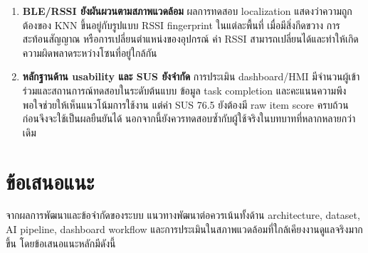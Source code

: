 \begin{enumerate}
    \item \textbf{BLE/RSSI ยังผันผวนตามสภาพแวดล้อม} ผลการทดสอบ localization แสดงว่าความถูกต้องของ KNN ขึ้นอยู่กับรูปแบบ RSSI fingerprint ในแต่ละพื้นที่ เมื่อมีสิ่งกีดขวาง การสะท้อนสัญญาณ หรือการเปลี่ยนตำแหน่งของอุปกรณ์ ค่า RSSI สามารถเปลี่ยนได้และทำให้เกิดความผิดพลาดระหว่างโซนที่อยู่ใกล้กัน

    \item \textbf{หลักฐานด้าน usability และ SUS ยังจำกัด} การประเมิน dashboard/HMI มีจำนวนผู้เข้าร่วมและสถานการณ์ทดสอบในระดับต้นแบบ ข้อมูล task completion และคะแนนความพึงพอใจช่วยให้เห็นแนวโน้มการใช้งาน แต่ค่า SUS 76.5 ยังต้องมี raw item score ครบถ้วนก่อนจึงจะใช้เป็นผลยืนยันได้ นอกจากนี้ยังควรทดสอบซ้ำกับผู้ใช้จริงในบทบาทที่หลากหลายกว่าเดิม
\end{enumerate}

\section{ข้อเสนอแนะ}
\label{sec:ch5_future_work}

จากผลการพัฒนาและข้อจำกัดของระบบ แนวทางพัฒนาต่อควรเน้นทั้งด้าน architecture, dataset, AI pipeline, dashboard workflow และการประเมินในสภาพแวดล้อมที่ใกล้เคียงงานดูแลจริงมากขึ้น โดยข้อเสนอแนะหลักมีดังนี้

